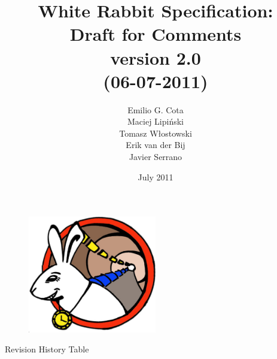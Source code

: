 \documentclass[a4paper, 12pt]{article}
\begin{document}
\title{White Rabbit Specification: \\Draft for Comments\\\normalsize {version 2.0}\\\small{(06-07-2011)}}
\author{Emilio G. Cota\\Maciej Lipi\'{n}ski\\Tomasz W\l{}ostowski\\Erik van der Bij\\Javier Serrano}
\date{July 2011}
\maketitle
\thispagestyle{empty}

\begin{figure}[ht!]
  \centering
  \vspace{1.3cm}
  \includegraphics[width=0.50\textwidth]{logo/WRlogo.pdf}
  \label{fig:wr_logo}
\end{figure}




\newpage

\setcounter{page}{1}
\begin{center}
\large Revision History Table 
\end{center} 
\end{document}
